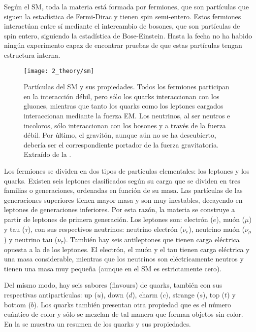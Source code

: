 Según el \ac{SM}, toda la materia está formada por fermiones, que son partículas que siguen la estadística de Fermi-Dirac y tienen spin semi-entero. Estos fermiones interactúan entre sí mediante el intercambio de bosones, que son partículas de spin entero, siguiendo la estadística de Bose-Einstein. Hasta la fecha no ha habido ningún experimento capaz de encontrar pruebas de que estas partículas tengan estructura interna.

\begin{figure}[ht!]
    \centering
    \texttt{[image: 2\_theory/sm]}
    \caption{Partículas del \ac{SM} y sus propiedades. Todos los fermiones participan en la interacción débil, pero sólo los quarks interaccionan con los gluones, mientras que tanto los quarks como los leptones cargados interaccionan mediante la fuerza \ac{EM}. Los neutrinos, al ser neutros e incoloros, sólo interaccionan con los bosones \Wboson y \Zboson a través de la fuerza débil. Por último, el gravitón, aunque aún no se ha descubierto, debería ser el correspondiente portador de la fuerza gravitatoria. Extraído de la .}
    \label{fig:theory:sm:particles_interaction:particles}
\end{figure}

Los fermiones se dividen en dos tipos de partículas elementales: los leptones y los quarks. Existen seis leptones clasificados según su carga que se dividen en tres familias o generaciones, ordenadas en función de su masa. Las partículas de las generaciones superiores tienen mayor masa y son muy inestables, decayendo en leptones de generaciones inferiores. Por esta razón, la materia se construye a partir de leptones de primera generación. Los leptones son: electrón (\(e\)), muón (\(\mu\)) y tau (\(\tau\)), con sus respectivos neutrinos: neutrino electrón (\(\nu_{e}\)), neutrino muón (\(\nu_{\mu}\)) y neutrino tau (\(\nu_{\tau}\)).
También hay seis antileptones que tienen carga eléctrica opuesta a la de los leptones. El electrón, el muón y el tau tienen carga eléctrica y una masa considerable, mientras que los neutrinos son eléctricamente neutros y tienen una masa muy pequeña (aunque en el \ac{SM} es estrictamente cero).

Del mismo modo, hay seis sabores (flavours) de quarks, también con sus respectivas antipartículas: up (\(u\)), down (\(d\)), charm (\(c\)), strange (\(s\)), top (\(t\)) y bottom (\(b\)). Los quarks también presentan otra propiedad que es el número cuántico de color y sólo se mezclan de tal manera que forman objetos sin color. En la \Fig{\ref{fig:theory:sm:particles_interaction:particles}} se muestra un resumen de los quarks y sus propiedades.


